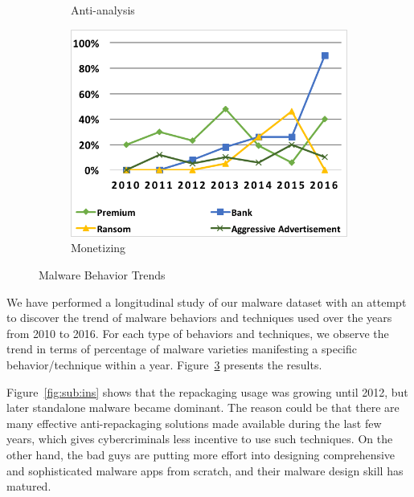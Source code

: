 \begin{figure}[t!]
\begin{subfigure}[b]{.32\textwidth}
  \caption{Anti-analysis}
  \label{fig:sub:anti}
\end{subfigure}%
\begin{subfigure}[b]{.32\textwidth}
  \centering
  \includegraphics[width=0.9\linewidth]{fig/charts/mone.png}
  \caption{Monetizing}
  \label{fig:sub:mono}
\end{subfigure}
\caption{Malware Behavior Trends %
}
\vspace{-.25in}
\label{fig:behaviorcharts}
\end{figure}

We have performed a longitudinal study of our malware dataset with an attempt
to discover the trend of malware behaviors and techniques used over the years
from 2010 to 2016. For each type of behaviors and techniques, 
we observe the trend in terms of percentage of malware varieties manifesting a specific 
behavior/technique within a year.
Figure~\ref{fig:behaviorcharts} presents the results.

Figure~\ref{fig:sub:ins} shows that the repackaging usage was growing until 2012,
but later standalone malware became dominant. The reason could be that
there are many effective anti-repackaging solutions made available during the last few years, 
which gives cybercriminals less incentive to use such techniques.
On the other hand, the bad guys are putting more effort into designing comprehensive
and sophisticated malware apps from scratch, and their malware design skill has matured. 

